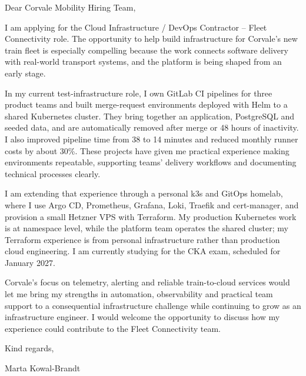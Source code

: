 \documentclass[11pt,a4paper]{article}
\begin{document}
Dear Corvale Mobility Hiring Team,

I am applying for the Cloud Infrastructure / DevOps Contractor -- Fleet Connectivity role. The opportunity to help build infrastructure for Corvale’s new train fleet is especially compelling because the work connects software delivery with real-world transport systems, and the platform is being shaped from an early stage.

In my current test-infrastructure role, I own GitLab CI pipelines for three product teams and built merge-request environments deployed with Helm to a shared Kubernetes cluster. They bring together an application, PostgreSQL and seeded data, and are automatically removed after merge or 48 hours of inactivity. I also improved pipeline time from 38 to 14 minutes and reduced monthly runner costs by about 30\%. These projects have given me practical experience making environments repeatable, supporting teams’ delivery workflows and documenting technical processes clearly.

I am extending that experience through a personal k3s and GitOps homelab, where I use Argo CD, Prometheus, Grafana, Loki, Traefik and cert-manager, and provision a small Hetzner VPS with Terraform. My production Kubernetes work is at namespace level, while the platform team operates the shared cluster; my Terraform experience is from personal infrastructure rather than production cloud engineering. I am currently studying for the CKA exam, scheduled for January 2027.

Corvale’s focus on telemetry, alerting and reliable train-to-cloud services would let me bring my strengths in automation, observability and practical team support to a consequential infrastructure challenge while continuing to grow as an infrastructure engineer. I would welcome the opportunity to discuss how my experience could contribute to the Fleet Connectivity team.

Kind regards,

Marta Kowal-Brandt
\end{document}
